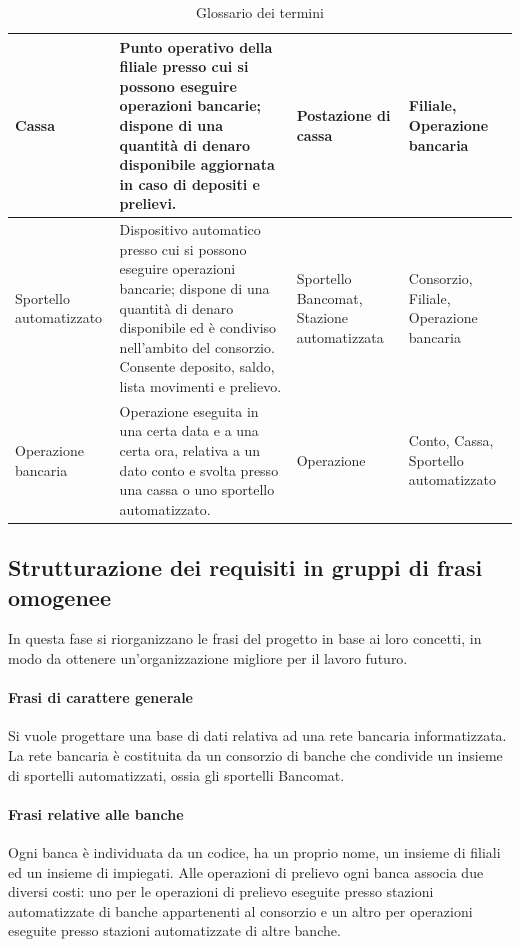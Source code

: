 \begin{table}[H]
\begin{tabularx}{\textwidth}{@{}
      >{\raggedright\arraybackslash}p{2.3cm}
      >{\raggedright\arraybackslash}X
      >{\raggedright\arraybackslash}p{2.6cm}
      >{\raggedright\arraybackslash}p{3.2cm}
    @{}}
    Cassa & Punto operativo della filiale presso cui si possono eseguire operazioni bancarie; dispone di una quantità di denaro disponibile aggiornata in caso di depositi e prelievi. & Postazione di cassa & Filiale, Operazione bancaria \\
    \midrule

    Sportello automatizzato & Dispositivo automatico presso cui si possono eseguire operazioni bancarie; dispone di una quantità di denaro disponibile ed è condiviso nell'ambito del consorzio. Consente deposito, saldo, lista movimenti e prelievo. & Sportello Bancomat, Stazione automatizzata & Consorzio, Filiale, Operazione bancaria \\
    \midrule

    Operazione bancaria & Operazione eseguita in una certa data e a una certa ora, relativa a un dato conto e svolta presso una cassa o uno sportello automatizzato. & Operazione & Conto, Cassa, Sportello automatizzato \\
    \bottomrule
  \end{tabularx}
  \caption{Glossario dei termini}
  \label{tab:glossario}
\end{table}

\subsection{Strutturazione dei requisiti in gruppi di frasi omogenee}
In questa fase si riorganizzano le frasi del progetto in base ai loro concetti, in modo da ottenere un'organizzazione migliore per il lavoro futuro.

\paragraph{Frasi di carattere generale}
Si vuole progettare una base di dati relativa ad una rete bancaria informatizzata. La rete bancaria è costituita da un consorzio di banche che condivide un insieme di sportelli automatizzati, ossia gli sportelli Bancomat.
\paragraph{Frasi relative alle banche}
Ogni banca è individuata da un codice, ha un proprio nome, un insieme di filiali ed un insieme di impiegati. Alle operazioni di prelievo ogni banca associa due diversi costi: uno per le operazioni di prelievo eseguite presso stazioni automatizzate di banche appartenenti al consorzio e un altro per operazioni eseguite presso stazioni automatizzate di altre banche.

